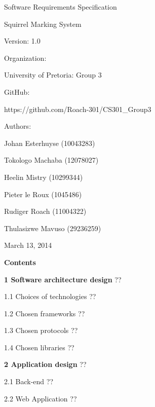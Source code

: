 \documentclass{article}
\begin{document}

\noindent 

\noindent 

\noindent 

\noindent 



 

\noindent 

\noindent  Software Requirements Specification

\noindent   Squirrel Marking System

\noindent   Version: 1.0

\noindent 

\noindent Organization:

\noindent University of Pretoria: Group 3

\noindent  GitHub:

\noindent  

 https://github.com/Roach-301/CS301\_Group3 

\noindent 

\noindent Authors:

\noindent Johan Esterhuyse (10043283)

\noindent Tokologo Machaba (12078027)

\noindent Heelin Mistry (10299344)

\noindent Pieter le Roux (1045486)

\noindent Rudiger Roach (11004322)

\noindent Thulasizwe Mavuso (29236259)

\noindent 

\noindent March 13, 2014 

  

\textbf{Contents}





\textbf{1  Software architecture design }??

    1.1  Choices of technologies ??

    1.2  Chosen frameworks ??

    1.3  Chosen protocols ??

    1.4  Chosen libraries ??



\textbf{2  Application design }??

    2.1  Back-end ??

    2.2  Web Application ??
\end{document}
